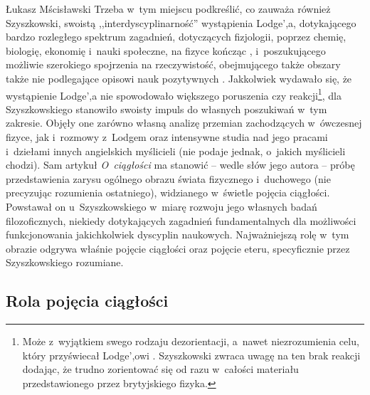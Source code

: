 \begin{artplenv}{Łukasz Mścisławski}
Trzeba w~tym miejscu podkreślić, co zauważa również Szyszkowski, swoistą ,,interdyscyplinarność'' wystąpienia Lodge',a, dotykającego bardzo rozległego spektrum zagadnień, dotyczących fizjologii, poprzez chemię, biologię, ekonomię i~nauki społeczne, na fizyce kończąc
\parencite[][s.~5]{lodge_continuity_1914}, %
 i~poszukującego możliwie szerokiego spojrzenia na rzeczywistość, obejmującego także obszary także nie podlegające opisowi nauk pozytywnych 
\parencite[por.][s.~6]{lodge_continuity_1914}. %
 Jakkolwiek wydawało się, że wystąpienie Lodge',a nie spowodowało większego poruszenia czy reakcji\footnote{Może z~wyjątkiem swego rodzaju dezorientacji, a~nawet niezrozumienia celu, który przyświecał Lodge',owi 
\parencite[por.][s.~45]{szyszkowski_o_1916}. %
 Szyszkowski zwraca uwagę na ten brak reakcji dodając, że trudno zorientować się od razu w~całości materiału przedstawionego przez brytyjskiego fizyka. }, dla Szyszkowskiego stanowiło swoisty impuls do własnych poszukiwań w~tym zakresie. Objęły one zarówno własną analizę przemian zachodzących w~ówczesnej fizyce, jak i~rozmowy z~Lodgem oraz intensywne studia nad jego pracami i~dziełami innych angielskich myślicieli (nie podaje jednak, o~jakich myślicieli chodzi). Sam artykuł \textit{O~ciągłości} ma stanowić -- wedle słów jego autora -- próbę przedstawienia zarysu ogólnego obrazu świata fizycznego i~duchowego (nie precyzując rozumienia ostatniego), widzianego w~świetle pojęcia ciągłości. Powstawał on u~Szyszkowskiego w~miarę rozwoju jego własnych badań filozoficznych, niekiedy dotykających zagadnień fundamentalnych dla możliwości funkcjonowania jakichkolwiek dyscyplin naukowych. Najważniejszą rolę w~tym obrazie odgrywa właśnie pojęcie ciągłości oraz pojęcie eteru, specyficznie przez Szyszkowskiego rozumiane.

\subsection{Rola pojęcia ciągłości}


\end{artplenv}
